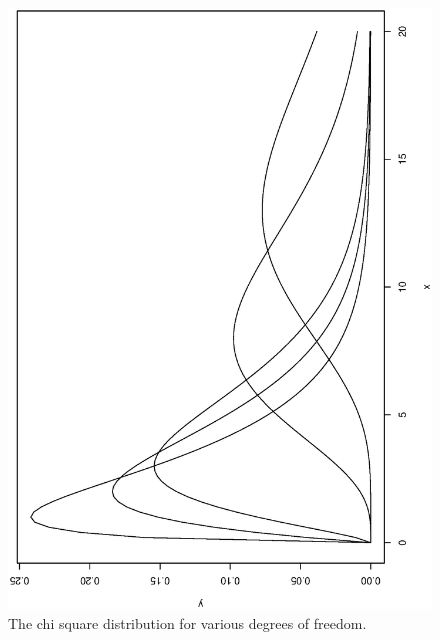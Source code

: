 \documentclass[captions=tableheading]{scrbook}
\begin{document}
\begin{figure}[th]
  \includegraphics[angle=270, totalheight=4in]{ps/chisq-dist-vary-df.ps}
  \caption[Chi square distribution for various degrees of freedom]{\small The chi square distribution for various degrees of freedom.}
  \label{fig:chisq-dist-vary-df}
\end{figure}
\end{document}
